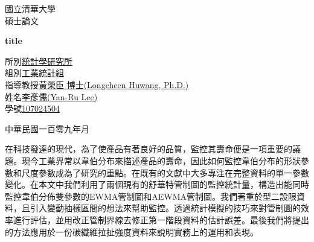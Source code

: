 \documentclass[12pt]{article}  %
\theoremstyle{plain}
\begin{document}
\begin{titlepage}  %
\begin{center}
\Large 國立清華大學\\
\Large 碩士論文\\
\vspace*{12ex}
\vspace*{3ex}
\begin{spacing}{1.3}
\textbf{\Large title}\\
\end{spacing}
\vspace*{18ex}
\end{center}


\begin{spacing}{1.3}
\hspace*{1cm}
\begin{minipage}[h]{\textwidth}
\raggedright
\Large 所\qquad 別\quad \underline{統計學研究所} \\
\Large 組\qquad 別\quad \underline{工業統計組} \\
\Large 指導教授\quad \underline{黃榮臣\: 博士(Longcheen Huwang, Ph.D.)}\\
\Large 姓\qquad 名\quad \underline{李彥儒(Yan-Ru Lee)}\\
\Large 學\qquad 號\quad \underline{107024504}
\vspace{6ex}
\end{minipage}
\end{spacing}

\begin{center}
\Large 中華民國一百零九年月
\end{center}

\end{titlepage}


\newpage  %
\begin{center}
\end{center}
\qquad 在科技發達的現代，為了使產品有著良好的品質，監控其壽命便是一項重要的議題。現今工業界常以韋伯分布來描述產品的壽命，因此如何監控韋伯分布的形狀參數和尺度參數成為了研究的重點。在既有的文獻中大多專注在完整資料的單一參數變化。在本文中我們利用了兩個現有的舒華特管制圖的監控統計量，構造出能同時監控韋伯分佈雙參數的EWMA管制圖和AEWMA管制圖。我們著重於型二設限資料，且引入變動抽樣區間的想法來幫助監控。透過統計模擬的技巧來對管制圖的效率進行評估，並用改正管制界線去修正第一階段資料的估計誤差。最後我們將提出的方法應用於一份碳纖維拉扯強度資料來說明實務上的運用和表現。
\end{document}
